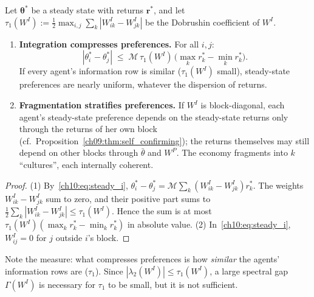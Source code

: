 \documentclass[../structural_economics_book.tex]{subfiles}
\begin{document}
\begin{proposition}\label{ch10:prop:two_types}
Let $\boldsymbol{\theta}^*$ be a steady state with returns $\mathbf{r}^*$, and let $\tau_1(W^I) := \frac{1}{2}\max_{i,j}\sum_k |W^I_{ik} - W^I_{jk}|$ be the Dobrushin coefficient of $W^I$.
\begin{enumerate}
\item \textbf{Integration compresses preferences.} For all $i, j$:
\begin{equation}\label{ch10:eq:dobrushin_bound}
|\theta_i^* - \theta_j^*| \;\leq\; \mathcal{M}\,\tau_1(W^I)\,\big(\max_k r_k^* - \min_k r_k^*\big).
\end{equation}
If every agent's information row is similar ($\tau_1(W^I)$ small), steady-state preferences are nearly uniform, whatever the dispersion of returns.
\item \textbf{Fragmentation stratifies preferences.} If $W^I$ is block-diagonal, each agent's steady-state preference depends on the steady-state returns only through the returns of her own block (cf.\ Proposition~\ref{ch09:thm:self_confirming}); the returns themselves may still depend on other blocks through $\bar{\theta}$ and $W^P$. The economy fragments into $k$ ``cultures'', each internally coherent.
\end{enumerate}
\end{proposition}

\begin{proof}
(1) By~\eqref{ch10:eq:steady_i}, $\theta_i^* - \theta_j^* = \mathcal{M}\sum_k (W^I_{ik} - W^I_{jk}) r_k^*$. The weights $W^I_{ik} - W^I_{jk}$ sum to zero, and their positive part sums to $\frac12\sum_k|W^I_{ik} - W^I_{jk}| \le \tau_1(W^I)$. Hence the sum is at most $\tau_1(W^I)(\max_k r_k^* - \min_k r_k^*)$ in absolute value. (2) In~\eqref{ch10:eq:steady_i}, $W^I_{ij} = 0$ for $j$ outside $i$'s block.
\end{proof}

Note the measure: what compresses preferences is how \textit{similar} the agents' information rows are ($\tau_1$). Since $|\lambda_2(W^I)| \le \tau_1(W^I)$, a large spectral gap $\Gamma(W^I)$ is necessary for $\tau_1$ to be small, but it is not sufficient.
\end{document}
